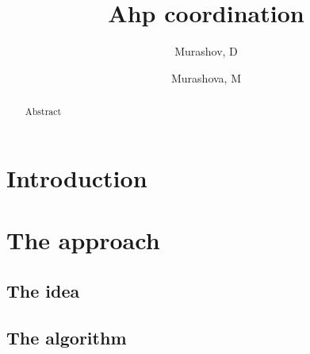 \documentclass{article}
\author{Murashov, D \and Murashova, M}
\title{Ahp coordination}
\begin{document}
    \maketitle

    \begin{abstract}
        Abstract
    \end{abstract}

    \section{Introduction}

    

    

    \section{The approach}

    \subsection{The idea}

    

    \subsection{The algorithm}

    

    \medskip

    

    
\end{document}
